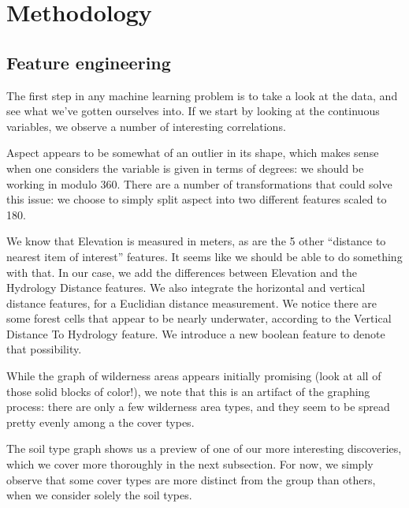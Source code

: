 \section{Methodology}
\label{sec:-method}


\subsection{Feature engineering}
The first step in any machine learning problem is to take a look at the 
data, and see what we've gotten ourselves into.  If we start by looking 
at the continuous variables, we observe a number of interesting 
correlations.  

Aspect appears to be somewhat of an outlier in its shape, 
which makes sense when one considers the variable is given in terms of 
degrees: we should be working in modulo 360.  There are a number of 
transformations that could solve this issue: we choose to simply split 
aspect into two different features scaled to 180\degree.

We know that Elevation is measured in meters, as are the 5 other 
``distance to nearest item of interest'' features.  It seems like we 
should be able to do something with that.  In our case, we add the 
differences between Elevation and the Hydrology Distance features.  We 
also integrate the horizontal and vertical distance features, for a 
Euclidian distance measurement. We notice there are some forest cells 
that appear to be nearly underwater, according to the Vertical Distance 
To Hydrology feature.  We introduce a new boolean feature to denote 
that possibility.  

While the graph of wilderness areas appears initially promising (look 
at all of those solid blocks of color!), we note that this is an 
artifact of the graphing process: there are only a few wilderness area 
types, and they seem to be spread pretty evenly among a the cover types.

The soil type graph shows us a preview of one of our more interesting 
discoveries, which we cover more thoroughly in the next subsection. For 
now, we simply observe that some cover types are more distinct from the 
group than others, when we consider solely the soil types.



